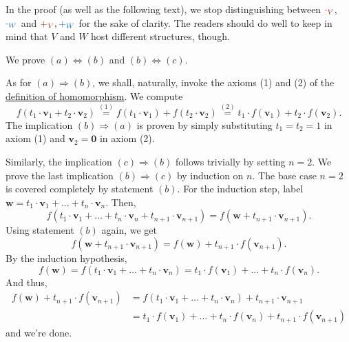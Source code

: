 \begin{lemproof}
 In the proof (as well as the following text), we stop distinguishing between
 $\clr{ \cdot _V}$, $\clb{ \cdot _W}$ and $\clr{+_V},\clb{+_W}$ for the sake of
 clarity. The readers should do well to keep in mind that $V$ and $W$ host
 different structures, though.

 We prove $(a) \Leftrightarrow (b)$ and $(b) \Leftrightarrow (c)$.

 As for $(a) \Rightarrow (b)$, we shall, naturally, invoke the axioms (1) and
 (2) of the \hyperref[def:homomorphism]{definition of homomorphism}. We compute
 \[
  f(t_1 \cdot \mathbf{v}_1 + t_2 \cdot \mathbf{v}_2) \overset{(1)}{=} f(t_1
  \cdot \mathbf{v}_1) + f(t_2 \cdot \mathbf{v}_2) \overset{(2)}{=} t_1 \cdot
  f(\mathbf{v}_1) + t_2 \cdot f(\mathbf{v}_2).
 \]
 The implication $(b) \Rightarrow (a)$ is proven by simply substituting $t_1 =
 t_2 = 1$ in axiom (1) and $\mathbf{v}_2 = \mathbf{0}$ in axiom (2).

 Similarly, the implication $(c) \Rightarrow (b)$ follows trivially by setting
 $n = 2$. We prove the last implication $(b) \Rightarrow (c)$ by induction on
 $n$. The base case $n = 2$ is covered completely by statement $(b)$. For the
 induction step, label $\mathbf{w} = t_1 \cdot \mathbf{v}_1 + \ldots + t_n \cdot
 \mathbf{v}_n$. Then,
 \[
  f(t_1 \cdot \mathbf{v}_1 + \ldots + t_n \cdot \mathbf{v}_n + t_{n+1} \cdot
  \mathbf{v}_{n+1}) = f(\mathbf{w} + t_{n+1} \cdot \mathbf{v}_{n+1}).
 \]
 Using statement $(b)$ again, we get
 \[
  f(\mathbf{w} + t_{n+1} \cdot \mathbf{v}_{n+1}) = f(\mathbf{w}) + t_{n+1} \cdot
  f(\mathbf{v}_{n+1}).
 \]
 By the induction hypothesis,
 \[
  f(\mathbf{w}) = f(t_1 \cdot \mathbf{v}_1 + \ldots + t_n \cdot \mathbf{v}_n) =
  t_1 \cdot f(\mathbf{v}_1) + \ldots + t_n \cdot f(\mathbf{v}_n).
 \]
 And thus,
 \begin{align*}
  f(\mathbf{w}) + t_{n+1} \cdot f(\mathbf{v}_{n+1}) &= f(t_1 \cdot \mathbf{v}_1 +
  \ldots + t_n \cdot \mathbf{v}_n) + t_{n+1} \cdot \mathbf{v}_{n+1}\\
                                                    &= t_1 \cdot
  f(\mathbf{v}_{1}) + \ldots + t_n \cdot f(\mathbf{v}_n) + t_{n+1} \cdot
  f(\mathbf{v}_{n+1})
 \end{align*}
 and we're done.
\end{lemproof}

